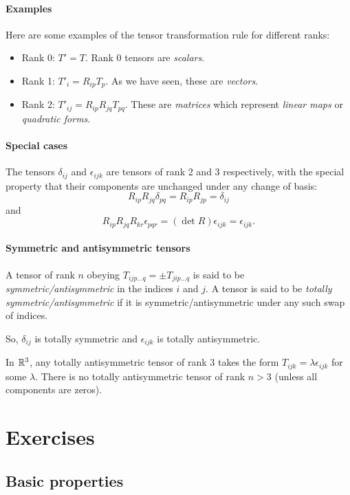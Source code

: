 \documentclass{article}
\begin{document}
\paragraph{Examples} Here are some examples of the tensor transformation rule for different ranks:
\begin{itemize}
    \item Rank 0: $T' = T$. Rank 0 tensors are \textit{scalars}. 
    \item Rank 1: $T'_i = R_{ip} T_p$. As we have seen, these are \textit{vectors}.
    \item Rank 2: $T'_{ij} = R_{ip}R_{jq} T_{pq}$. These are \textit{matrices} which represent \textit{linear maps} or \textit{quadratic forms}.
\end{itemize}

\paragraph{Special cases} The tensors $\delta_{ij}$ and $\epsilon_{ijk}$ are
tensors of rank 2 and 3 respectively, with the special property that their
components are unchanged under any change of basis:
$$ R_{ip} R_{jq} \delta_{pq} = R_{ip}R_{jp} = \delta_{ij} $$
and 
$$ R_{ip} R_{jq} R_{kr} \epsilon_{pqr} = (\det R)\epsilon_{ijk} = \epsilon_{ijk}. $$

\paragraph{Symmetric and antisymmetric tensors} A tensor of rank $n$ obeying 
$T_{ijp\dots q} = \pm T_{jip\dots q}$ is said to be
\textit{symmetric/antisymmetric} in the indices $i$ and $j$. A tensor is said to
be \textit{totally symmetric/antisymmetric} if it is symmetric/antisymmetric
under any such swap of indices.

So, $\delta_{ij}$ is totally symmetric and $\epsilon_{ijk}$ is totally
antisymmetric.

In $\mathbb{R}^3$, any totally antisymmetric tensor of rank 3 takes the form
$T_{ijk} = \lambda \epsilon_{ijk}$ for some $\lambda$. There is no totally
antisymmetric tensor of rank $n>3$ (unless all components are zeros).

\section{Exercises}

\subsection{Basic properties}
\end{document}
